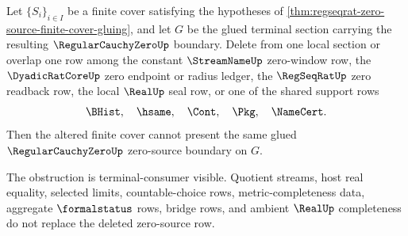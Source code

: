 \begin{theorem}
\label{thm:regseqrat-zero-source-deleted-row-obstruction}
Let $\{S_i\}_{i \in I}$ be a finite cover satisfying the hypotheses of \autoref{thm:regseqrat-zero-source-finite-cover-gluing}, and let $G$ be the glued terminal section carrying the resulting $\RegularCauchyZeroUp$ boundary. Delete from one local section or overlap one row among the constant $\StreamNameUp$ zero-window row, the $\DyadicRatCoreUp$ zero endpoint or radius ledger, the $\RegSeqRatUp$ zero readback row, the local $\RealUp$ seal row, or one of the shared support rows
$$
\BHist,\quad \hsame,\quad \Cont,\quad \Pkg,\quad \NameCert.
$$
Then the altered finite cover cannot present the same glued $\RegularCauchyZeroUp$ zero-source boundary on $G$.

The obstruction is terminal-consumer visible. Quotient streams, host real equality, selected limits, countable-choice rows, metric-completeness data, aggregate $\formalstatus$ rows, bridge rows, and ambient $\RealUp$ completeness do not replace the deleted zero-source row.
\end{theorem}

